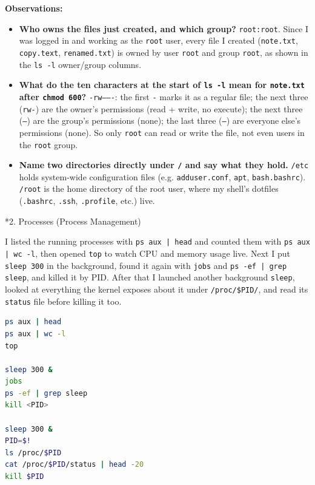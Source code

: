 \documentclass[12pt,a4paper]{article}
\makeatletter
\renewcommand\subsection{\@startsection{subsection}{2}{0pt}{12pt}{5pt}{\normalfont\large\bfseries}}
\makeatother
\begin{document}
\noindent\textbf{Observations:}
\begin{itemize}
  \item \textbf{Who owns the files just created, and which group?} \texttt{root:root}.
        Since I was logged in and working as the \texttt{root} user, every file I
        created (\texttt{note.txt}, \texttt{copy.text}, \texttt{renamed.txt}) is
        owned by user \texttt{root} and group \texttt{root}, as shown in the
        \texttt{ls -l} owner/group columns.
  \item \textbf{What do the ten characters at the start of \texttt{ls -l} mean for
        \texttt{note.txt} after \texttt{chmod 600}?} \texttt{-rw-------}: the first
        \texttt{-} marks it as a regular file; the next three (\texttt{rw-}) are
        the owner's permissions (read + write, no execute); the next three
        (\texttt{---}) are the group's permissions (none); the last three
        (\texttt{---}) are everyone else's permissions (none). So only
        \texttt{root} can read or write the file, not even users in the
        \texttt{root} group.
  \item \textbf{Name two directories directly under \texttt{/} and say what they
        hold.} \texttt{/etc} holds system-wide configuration files (e.g.
        \texttt{adduser.conf}, \texttt{apt}, \texttt{bash.bashrc}). \texttt{/root}
        is the home directory of the root user, where my shell's dotfiles
        (\texttt{.bashrc}, \texttt{.ssh}, \texttt{.profile}, etc.) live.
\end{itemize}

\subsection*{2. Processes (Process Management)}

\hspace{0.8cm} I listed the running processes with \texttt{ps aux | head} and
counted them with \texttt{ps aux | wc -l}, then opened \texttt{top} to watch
CPU and memory usage live. Next I put \texttt{sleep 300} in the background, found
it again with \texttt{jobs} and \texttt{ps -ef | grep sleep}, and killed it by
PID. After that I launched another background \texttt{sleep}, looked at
everything the kernel exposes about it under \texttt{/proc/\$PID/}, and read its
\texttt{status} file before killing it too.

\par\noindent\begin{minipage}{\linewidth}
\begin{lstlisting}[language=bash, caption={Commands run for process management}]
ps aux | head
ps aux | wc -l
top

sleep 300 &
jobs
ps -ef | grep sleep
kill <PID>

sleep 300 &
PID=$!
ls /proc/$PID
cat /proc/$PID/status | head -20
kill $PID
\end{lstlisting}
\end{minipage}\par
\end{document}
